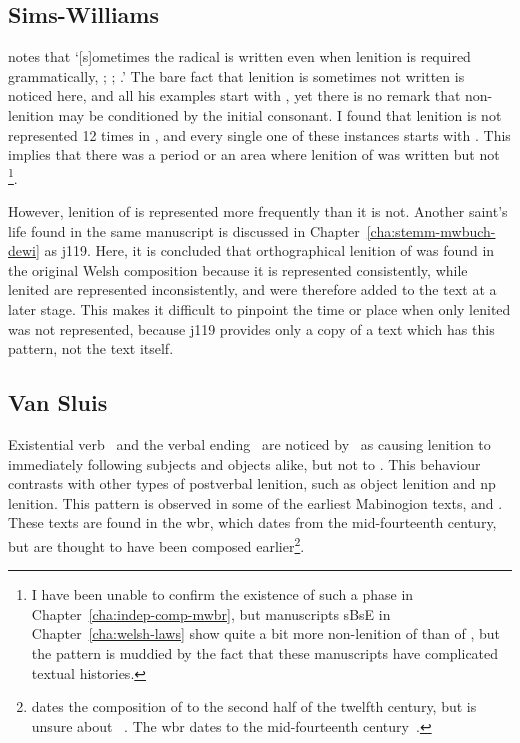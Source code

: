 \subsection{Sims-Williams}
\label{sec:sims-williams}

\Textcite[107n]{Sim_Buchedd18} notes that `[s]ometimes the radical is written even when lenition is required grammatically, \eg {}; ; .' The bare fact that lenition is sometimes not written is noticed here, and all his examples start with , yet there is no remark that non-lenition may be conditioned by the initial consonant. I found that lenition is not represented 12 times in , and every single one of these instances starts with . This implies that there was a period or an area where lenition of  was written but not \footnote{I have been unable to confirm the existence of such a phase in Chapter~\ref{cha:indep-comp-mwbr}, but manuscripts \gls{sB}\gls{sE} in Chapter~\ref{cha:welsh-laws} show quite a bit more non-lenition of  than of , but the pattern is muddied by the fact that these manuscripts have complicated textual histories.}.

However, lenition of  is represented more frequently than it is not. Another saint's life found in the same manuscript  is discussed in Chapter~\ref{cha:stemm-mwbuch-dewi} as \gls{j119}. Here, it is concluded that orthographical lenition of  was found in the original Welsh composition because it is represented consistently, while lenited  are represented inconsistently, and were therefore added to the text at a later stage. This makes it difficult to pinpoint the time or place when only lenited  was not represented, because \gls{j119} provides only a copy of a text which has this pattern, not the text itself.

\subsection{Van Sluis}
\label{sec:van-sluis}

Existential verb \oes\ and the verbal ending \ei\ are noticed by~\textcite{van_development14} as causing lenition to immediately following subjects and objects alike, but not to . This behaviour contrasts with other types of postverbal lenition, such as object lenition and \gls{np} lenition. This pattern is observed in some of the earliest Mabinogion texts, \ie {} and . These texts are found in the \gls{wbr}, which dates from the mid-fourteenth century, but are thought to have been composed earlier\footnote{\Textcite[43]{rodway_date_2005} dates the composition of  to the second half of the twelfth century, but is unsure about ~\autocite[59]{Rod_Where07}. The \gls{wbr} dates to the mid-fourteenth century~\autocite[59]{huws_medieval_2000}.}.

